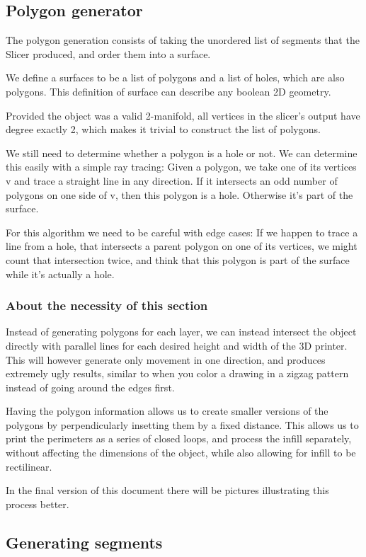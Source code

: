 \subsection{Polygon generator}
The polygon generation consists of taking the unordered list of segments that the Slicer produced, and order them into a surface.

We define a surfaces to be a list of polygons and a list of holes, which are also polygons. This definition of surface can describe any boolean 2D geometry.

Provided the object was a valid 2-manifold, all vertices in the slicer's output have degree exactly 2, which makes it trivial to construct the list of polygons.

We still need to determine whether a polygon is a hole or not. We can determine this easily with a simple ray tracing: Given a polygon, we take one of its vertices v and trace a straight line in any direction. If it intersects an odd number of polygons on one side of v, then this polygon is a hole. Otherwise it's part of the surface.

For this algorithm we need to be careful with edge cases: If we happen to trace a line from a hole, that intersects a parent polygon on one of its vertices, we might count that intersection twice, and think that this polygon is part of the surface while it's actually a hole.

\subsubsection{About the necessity of this section}
Instead of generating polygons for each layer, we can instead intersect the object directly with parallel lines for each desired height and width of the 3D printer. This will however generate only movement in one direction, and produces extremely ugly results, similar to when you color a drawing in a zigzag pattern instead of going around the edges first.

Having the polygon information allows us to create smaller versions of the polygons by perpendicularly insetting them by a fixed distance. This allows us to print the perimeters as a series of closed loops, and process the infill separately, without affecting the dimensions of the object, while also allowing for infill to be rectilinear.

In the final version of this document there will be pictures illustrating this process better.
\subsection{Generating segments}

